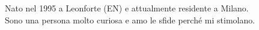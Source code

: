\documentclass[9pt]{developercv} %
\begin{document}
\vspace{0.5cm}



\begin{figure}[!htb]
    \centering
    \begin{minipage}{0.5\textwidth} %
    \vspace{0.3cm}
	\vspace{-\baselineskip} %
	
	Nato nel 1995 a Leonforte (EN) e attualmente residente a Milano.\\
	Sono una persona molto curiosa e amo le sfide perché mi stimolano.\\

	\end{minipage}
	\hfill %
	\begin{minipage}{0.4\textwidth} %
		\centering
	\end{minipage}
\end{figure}

\vspace{0.5cm}






\end{document}
